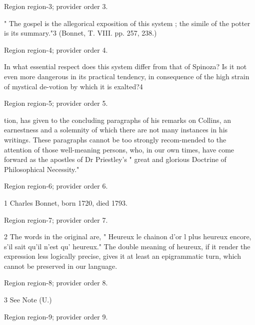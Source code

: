 \documentclass[11pt]{article}
\begin{document}
{\scriptsize\color{gray} Region region-3; provider order 3.\par}
\medskip

" The gospel is the allegorical exposition of this system ; the simile of the potter is its summary."3 (Bonnet, T. VIII. pp. 257, 238.)
\par

{\scriptsize\color{gray} Region region-4; provider order 4.\par}
\medskip

In what essential respect does this system differ from that of Spinoza? Is it not even more dangerous in its practical tendency, in consequence of the high strain of mystical de-votion by which it is exalted?4
\par

{\scriptsize\color{gray} Region region-5; provider order 5.\par}
\medskip

tion, has given to the concluding paragraphs of his remarks on Collins, an earnestness and a solemnity of which there are not many instances in his writings. These paragraphs cannot be too strongly recom-mended to the attention of those well-meaning persons, who, in our own times, have come forward as the apostles of Dr Priestley’s " great and glorious Doctrine of Philosophical Necessity."
\par

{\scriptsize\color{gray} Region region-6; provider order 6.\par}
\medskip

1 Charles Bonnet, born 1720, died 1793.
\par

{\scriptsize\color{gray} Region region-7; provider order 7.\par}
\medskip

2 The words in the original are, " Heureux le chainon d'or l plus heureux encore, s'il sait qu'il n'est qu' heureux." The double meaning of heureux, if it render the expression less logically precise, gives it at least an epigrammatic turn, which cannot be preserved in our language.
\par

{\scriptsize\color{gray} Region region-8; provider order 8.\par}
\medskip

3 See Note (U.)
\par

{\scriptsize\color{gray} Region region-9; provider order 9.\par}
\medskip
\end{document}
